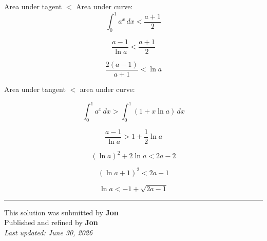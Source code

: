 \documentclass[12pt]{article}
\begin{document}
Area under tagent $<$ Area under curve:
$$\int_0^1a^x\,dx<\frac{a+1}{2}$$

$$\frac{a-1}{\ln a}<\frac{a+1}{2}$$

$$\frac{2(a-1)}{a+1}<\ln a$$

Area under tangent $<$ area under curve:

$$\int_0^1a^x\,dx>\int_0^1(1+x\ln a)\,dx$$

$$\frac{a-1}{\ln a}>1+\frac12\ln a$$

$$(\ln a)^2+2\ln a<2a-2$$

$$(\ln a+1)^2<2a-1$$

$$\ln a<-1+\sqrt{2a-1}$$


\bigskip
\hrule
\begin{center}
    This solution was submitted by \textbf{Jon}\\[4pt]
    Published and refined by \textbf{Jon}\\[8pt]
    \textit{Last updated: June 30, 2026}
\end{center}
\end{document}
